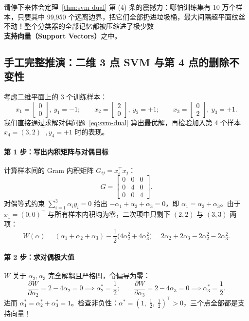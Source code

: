 请停下来体会定理~\ref{thm:svm-dual} 第 (4) 条的震撼力：哪怕训练集有 10 万个样本，只要其中 99{,}950 个远离边界，把它们全部扔进垃圾桶，最大间隔超平面纹丝不动！整个分类器的全部记忆都被压缩进了极少数\textbf{支持向量（Support Vectors）}之中。

\subsection{手工完整推演：二维 3 点 SVM 与第 4 点的删除不变性}

\begin{example}\label{ex:svm-hand}
考虑二维平面上的 3 个训练样本：
\[
  x_1 = \begin{bmatrix}0 \\ 0\end{bmatrix},\ y_1 = -1; \qquad
  x_2 = \begin{bmatrix}2 \\ 0\end{bmatrix},\ y_2 = +1; \qquad
  x_3 = \begin{bmatrix}0 \\ 2\end{bmatrix},\ y_3 = +1.
\]
我们直接通过求解对偶问题~\eqref{eq:svm-dual} 算出最优解，再检验加入第 4 个样本 $x_4 = (3, 2)^\top, y_4 = +1$ 时的表现。
\end{example}

\paragraph{第 1 步：写出内积矩阵与对偶目标}
计算样本间的 Gram 内积矩阵 $G_{ij} = x_i^\top x_j$：
\[
  G = \begin{bmatrix}
    0 & 0 & 0 \\
    0 & 4 & 0 \\
    0 & 0 & 4
  \end{bmatrix}.
\]
对偶等式约束 $\sum_{i=1}^3 \alpha_i y_i = 0$ 给出 $-\alpha_1 + \alpha_2 + \alpha_3 = 0$，即 $\alpha_1 = \alpha_2 + \alpha_3$。由于 $x_1 = (0,0)^\top$ 与所有样本内积均为零，二次项中只剩下 $(2,2)$ 与 $(3,3)$ 两项：
\[
  W(\alpha) = (\alpha_1 + \alpha_2 + \alpha_3) - \frac{1}{2}\big(4\alpha_2^2 + 4\alpha_3^2\big)
  = 2\alpha_2 + 2\alpha_3 - 2\alpha_2^2 - 2\alpha_3^2.
\]

\paragraph{第 2 步：求对偶极大值}
$W$ 关于 $\alpha_2, \alpha_3$ 完全解耦且严格凹，令偏导为零：
\[
  \frac{\partial W}{\partial \alpha_2} = 2 - 4\alpha_2 = 0 \implies \alpha_2^* = \frac{1}{2}; \qquad
  \frac{\partial W}{\partial \alpha_3} = 2 - 4\alpha_3 = 0 \implies \alpha_3^* = \frac{1}{2}.
\]
进而 $\alpha_1^* = \alpha_2^* + \alpha_3^* = 1$。检查非负性：$\alpha^* = (1,\; \frac{1}{2},\; \frac{1}{2})^\top > 0$，三个点全部都是支持向量！

